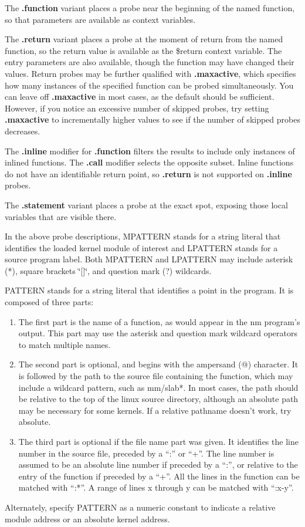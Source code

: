 \documentclass[twoside,english]{article}
\begin{document}
The \textbf{.function} variant places a probe near the beginning of the named
function, so that parameters are available as context variables.

The \textbf{.return} variant places a probe at the moment of return from the named
function, so the return value is available as the \$return context variable.
The entry parameters are also available, though the function may have changed
their values.  Return probes may be further qualified with \textbf{.maxactive},
which specifies how many instances of the specified function can be probed simultaneously.
You can leave off \textbf{.maxactive} in most cases, as the default should be sufficient.
However, if you notice an excessive number of skipped probes, try setting \textbf{.maxactive}
to incrementally higher values to see if the number of skipped probes decreases.

The \textbf{.inline} modifier for \textbf{.function} filters the results to include only
instances of inlined functions. The \textbf{.call} modifier selects the opposite subset.
Inline functions do not have an identifiable return point, so \textbf{.return}
is not supported on \textbf{.inline} probes.

The \textbf{.statement} variant places a probe at the exact spot, exposing those local
variables that are visible there.

In the above probe descriptions, MPATTERN stands for a string literal
that identifies the loaded kernel module of interest and LPATTERN
stands for a source program label. Both MPATTERN and LPATTERN may
include asterisk ({*}), square brackets \char`\"{}{[}]\char`\"{}, and
question mark (?) wildcards.

PATTERN stands for a string literal that identifies a point in the program.
It is composed of three parts:

\begin{enumerate}
\item The first part is the name of a function, as would appear in the nm program's
output. This part may use the asterisk and question mark wildcard operators
to match multiple names.
\item The second part is optional, and begins with the ampersand (@) character.
It is followed by the path to the source file containing the function,
which may include a wildcard pattern, such as mm/slab{*}.
In most cases, the path should be relative to the top of the
linux source directory, although an absolute path may be necessary for some kernels.
If a relative pathname doesn't work, try absolute.
\item The third part is optional if the file name part was given. It identifies
the line number in the source file, preceded by a ``:'' or ``+''.
The line number is assumed to be an
absolute line number if preceded by a ``:'', or relative to the entry of
the function if preceded by a ``+''.
All the lines in the function can be matched with ``:*''.
A range of lines x through y can be matched with ``:x-y''.

\end{enumerate}
Alternately, specify PATTERN as a numeric constant to indicate a relative
module address or an absolute kernel address.
\end{document}

